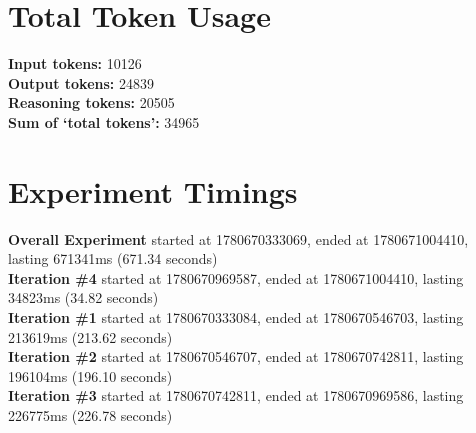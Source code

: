 \documentclass{article}
\begin{document}
\section*{Total Token Usage}
\textbf{Input tokens: }10126
\\\textbf{Output tokens: }24839
\\\textbf{Reasoning tokens: }20505
\\\textbf{Sum of `total tokens': }34965
\section*{Experiment Timings}
\textbf{Overall Experiment} started at 1780670333069, ended at 1780671004410, lasting 671341ms (671.34 seconds)
\\\textbf{Iteration \#4} started at 1780670969587, ended at 1780671004410, lasting 34823ms (34.82 seconds)
\\\textbf{Iteration \#1} started at 1780670333084, ended at 1780670546703, lasting 213619ms (213.62 seconds)
\\\textbf{Iteration \#2} started at 1780670546707, ended at 1780670742811, lasting 196104ms (196.10 seconds)
\\\textbf{Iteration \#3} started at 1780670742811, ended at 1780670969586, lasting 226775ms (226.78 seconds)
\end{document}
